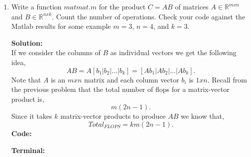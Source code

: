 \documentclass[12pt]{article}
\makeatletter
\theoremstyle{homework}
\newenvironment{exercise}[1]
{\def\@currentlabel{#1}\exercisecore}
{\endexercisecore}
\newcommand{\localhead}[1]{\par\smallskip\noindent\textbf{#1}\nobreak\\}%
\newcommand\solution{\localhead{Solution:}}
\newcommand{\Reals}{\ensuremath{\mathbb R}}
\let\RR\Reals
\makeatother
\begin{document}
\begin{exercise}{3}
\begin{enumerate}
        \item Write a function $matmat.m$ for the product $C = AB$ of matrices $A \in \RR^{mxn}$ and
        $B \in \RR^{nxk}$. Count the number of operations. Check your code against the Matlab results for 
        some example $m = 3$, $n = 4$, and $k = 3$.\\
        \solution If we consider the columns of $B$ as individual vectors we get the following idea,
        \begin{equation*}
            AB = A[b_1 | b_2 | ... | b_k] = [Ab_1 | Ab_2 | ... | Ab_k].
        \end{equation*}
        Note that $A$ is an $mxn$ matrix and each column vector $b_i$ is $1xn$. Recall from the previous problem that 
        the total number of flops for a matrix-vector product is,
        \begin{equation*}
            m(2n-1).
        \end{equation*}
        Since it takes $k$ matrix-vector products to produce $AB$ we know that, 
        \begin{equation*}
            Total_{FLOPS} = km(2n-1).
        \end{equation*}
        \textbf{Code:}
		\begin{center}
			
		\end{center}
        \textbf{Terminal:}
		\begin{center}
			
		\end{center}
    \end{enumerate}
\end{exercise}
\end{document}
